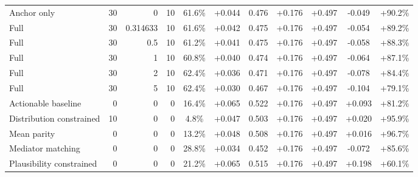 \begin{table}[htbp]
\begin{tabular}{lrrrccccccc}
Anchor only & 30 & 0 & 10 & 61.6\% & +0.044 & 0.476 & +0.176 & +0.497 & -0.049 & +90.2\% \\
Full & 30 & 0.314633 & 10 & 61.6\% & +0.042 & 0.475 & +0.176 & +0.497 & -0.054 & +89.2\% \\
Full & 30 & 0.5 & 10 & 61.2\% & +0.041 & 0.475 & +0.176 & +0.497 & -0.058 & +88.3\% \\
Full & 30 & 1 & 10 & 60.8\% & +0.040 & 0.474 & +0.176 & +0.497 & -0.064 & +87.1\% \\
Full & 30 & 2 & 10 & 62.4\% & +0.036 & 0.471 & +0.176 & +0.497 & -0.078 & +84.4\% \\
Full & 30 & 5 & 10 & 62.4\% & +0.030 & 0.467 & +0.176 & +0.497 & -0.104 & +79.1\% \\
Actionable baseline & 0 & 0 & 0 & 16.4\% & +0.065 & 0.522 & +0.176 & +0.497 & +0.093 & +81.2\% \\
Distribution constrained & 10 & 0 & 0 & 4.8\% & +0.047 & 0.503 & +0.176 & +0.497 & +0.020 & +95.9\% \\
Mean parity & 0 & 0 & 0 & 13.2\% & +0.048 & 0.508 & +0.176 & +0.497 & +0.016 & +96.7\% \\
Mediator matching & 0 & 0 & 0 & 28.8\% & +0.034 & 0.452 & +0.176 & +0.497 & -0.072 & +85.6\% \\
Plausibility constrained & 0 & 0 & 0 & 21.2\% & +0.065 & 0.515 & +0.176 & +0.497 & +0.198 & +60.1\% \\
\bottomrule
\end{tabular}
\end{table}